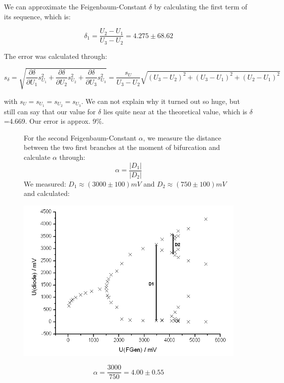 We can approximate the Feigenbaum-Constant $\delta$ by calculating the first term of its sequence, which is:

$$\boxed{\delta_1 = \frac{U_2-U_1}{U_3-U_2} = 4.275 \pm 68.62}$$

The error was calculated through:

$$s_\delta = \sqrt{\frac{\partial \delta}{\partial U_1}s_{U_1}^2 + \frac{\partial \delta}{\partial U_2}s_{U_2}^2 + \frac{\partial \delta}{\partial U_3}s_{U_3}^2} 
= \frac{s_U}{U_3-U_2}\sqrt{(U_3-U_2)^2 + (U_3-U_1)^2 + (U_2-U_1)^2}$$

with $s_U = s_{U_1} = s_{U_2} = s_{U_3}$. We can not explain why it turned out so huge, but still can say that our value for $\delta$ lies quite near at the theoretical value, which is $\delta$=4.669. Our error is approx. 9\%.

\begin{figure}[H]
\begin{minipage}{0.4\textwidth}
For the second Feigenbaum-Constant $\alpha$, we measure the distance between the two first branches at the moment of bifurcation and calculate $\alpha$ through:
$$\alpha = \frac{|D_1|}{|D_2|}$$
We measured: $D_1 \approx (3000 \pm 100) mV$ and $D_2 \approx (750\pm 100) mV$ and calculated:
\end{minipage}
\begin{minipage}{0.6\textwidth}
\centering \includegraphics[width=\textwidth]{Bilder/bifdiagD.png}
\end{minipage}
\end{figure}

$$\boxed{\alpha = \frac{3000}{750} = 4.00 \pm 0.55}$$

